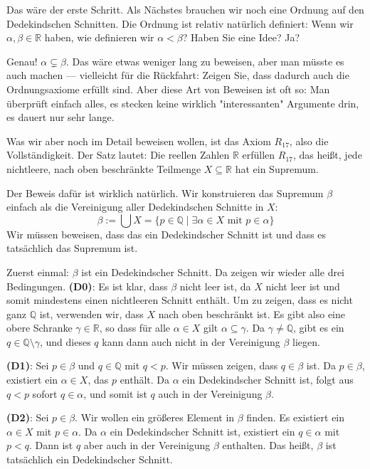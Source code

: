 \begin{spoken-clean}[00:49:12 - 00:52:12]
Das wäre der erste Schritt. Als Nächstes brauchen wir noch eine Ordnung auf den Dedekindschen Schnitten. Die Ordnung ist relativ natürlich definiert: Wenn wir $\alpha, \beta \in \mathbb{R}$ haben, wie definieren wir $\alpha < \beta$? Haben Sie eine Idee? Ja?


Genau! $\alpha \subsetneq \beta$. Das wäre etwas weniger lang zu beweisen, aber man müsste es auch machen --- vielleicht für die Rückfahrt: Zeigen Sie, dass dadurch auch die Ordnungsaxiome erfüllt sind. Aber diese Art von Beweisen ist oft so: Man überprüft einfach alles, es stecken keine wirklich "interessanten" Argumente drin, es dauert nur sehr lange.

Was wir aber noch im Detail beweisen wollen, ist das Axiom $R_{17}$, also die Vollständigkeit. Der Satz lautet: Die reellen Zahlen $\mathbb{R}$ erfüllen $R_{17}$, das heißt, jede nichtleere, nach oben beschränkte Teilmenge $X \subseteq \mathbb{R}$ hat ein Supremum.

Der Beweis dafür ist wirklich natürlich. Wir konstruieren das Supremum $\beta$ einfach als die Vereinigung aller Dedekindschen Schnitte in $X$:
\[ \beta := \bigcup X = \{ p \in \mathbb{Q} \mid \exists \alpha \in X \text{ mit } p \in \alpha \} \]
Wir müssen beweisen, dass das ein Dedekindscher Schnitt ist und dass es tatsächlich das Supremum ist.
\end{spoken-clean}

\begin{spoken-clean}[00:52:12 - 00:55:29]
Zuerst einmal: $\beta$ ist ein Dedekindscher Schnitt. Da zeigen wir wieder alle drei Bedingungen. \textbf{(D0)}: Es ist klar, dass $\beta$ nicht leer ist, da $X$ nicht leer ist und somit mindestens einen nichtleeren Schnitt enthält. Um zu zeigen, dass es nicht ganz $\mathbb{Q}$ ist, verwenden wir, dass $X$ nach oben beschränkt ist. Es gibt also eine obere Schranke $\gamma \in \mathbb{R}$, so dass für alle $\alpha \in X$ gilt $\alpha \subseteq \gamma$. Da $\gamma \neq \mathbb{Q}$, gibt es ein $q \in \mathbb{Q} \setminus \gamma$, und dieses $q$ kann dann auch nicht in der Vereinigung $\beta$ liegen.

\textbf{(D1)}: Sei $p \in \beta$ und $q \in \mathbb{Q}$ mit $q < p$. Wir müssen zeigen, dass $q \in \beta$ ist. Da $p \in \beta$, existiert ein $\alpha \in X$, das $p$ enthält. Da $\alpha$ ein Dedekindscher Schnitt ist, folgt aus $q < p$ sofort $q \in \alpha$, und somit ist $q$ auch in der Vereinigung $\beta$.

\textbf{(D2)}: Sei $p \in \beta$. Wir wollen ein größeres Element in $\beta$ finden. Es existiert ein $\alpha \in X$ mit $p \in \alpha$. Da $\alpha$ ein Dedekindscher Schnitt ist, existiert ein $q \in \alpha$ mit $p < q$. Dann ist $q$ aber auch in der Vereinigung $\beta$ enthalten. Das heißt, $\beta$ ist tatsächlich ein Dedekindscher Schnitt.
\end{spoken-clean}

